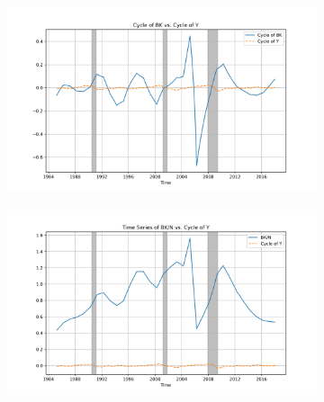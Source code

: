 \documentclass{article}
\begin{document}
\begin{figure}[H!]
\begin{subfigure}{0.45\textwidth}
  \centering
  \includegraphics[width=\linewidth]{BK_cycle_vs_Y_cycle.png}
\end{subfigure}%
\hspace{0.05\textwidth} %
\begin{subfigure}{0.45\textwidth}
  \centering
  \includegraphics[width=\linewidth]{BK_N_vs_Y_cycle.png}
\end{subfigure}
\end{figure}
\end{document}
